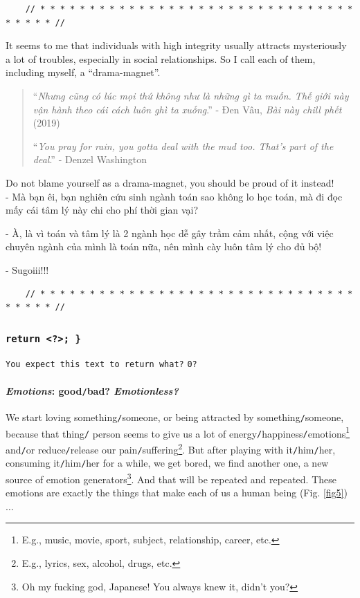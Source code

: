 \documentclass[12pt]{article}
\begin{document}
\begin{verbatim}
	// * * * * * * * * * * * * * * * * * * * * * * * * * * * * * * * * * * * * * //
\end{verbatim}

\noindent
{} It seems to me that individuals with high integrity usually attracts mysteriously a lot of troubles, especially in social relationships. So I call each of them, including myself, a ``drama-magnet''.

\begin{quotation}
	``{\it Nhưng cũng có lúc mọi thứ không như là những gì ta muốn. Thế giới này vận hành theo cái cách luôn ghì ta xuống}.'' - Đen Vâu, {\it Bài này chill phết} (2019)
	
	``{\it You pray for rain, you gotta deal with the mud too. That's part of the deal}.'' - Denzel Washington
\end{quotation}
Do not blame yourself as a drama-magnet, you should be proud of it instead!
\\

- Mà bạn êi, bạn nghiên cứu sinh ngành toán sao không lo học toán, mà đi đọc mấy cái tâm lý này chi cho phí thời gian vại?

- À, là vì toán và tâm lý là 2 ngành học dễ gây trầm cảm nhất, cộng với việc chuyên ngành của mình là toán nữa, nên mình cày luôn tâm lý cho đủ bộ!

- Sugoiii!!!

\begin{verbatim}
	// * * * * * * * * * * * * * * * * * * * * * * * * * * * * * * * * * * * * * //
\end{verbatim}

\subsubsection{\texttt{{\color{RubineRed}return} {\color{Purple}<?>}; \}}}
\texttt{\small You expect this text to return what?} \texttt{0?}

\paragraph{{\it Emotions}: good{\tt/}bad? {\it Emotionless?}}
\noindent
{} We start loving something{\tt/}someone, or being attracted by something{\tt/}someone, because that thing{\tt/} person seems to give us a lot of energy{\tt/}happiness{\tt/}emotions\footnote{E.g., music, movie, sport, subject, relationship, career, etc.} and{\tt/}or reduce{\tt/}release our pain{\tt/}suffering\footnote{E.g., lyrics, sex, alcohol, drugs, etc.}. But after playing with it{\tt/}him{\tt/}her, consuming it{\tt/}him{\tt/}her for a while, we get bored, we find another one, a new source of emotion generators\footnote{Oh my fucking god, Japanese! You always knew it, didn't you?}. And that will be repeated and repeated. These emotions are exactly the things that make each of us a human being (Fig. \ref{fig5})$\ldots$
\end{document}
